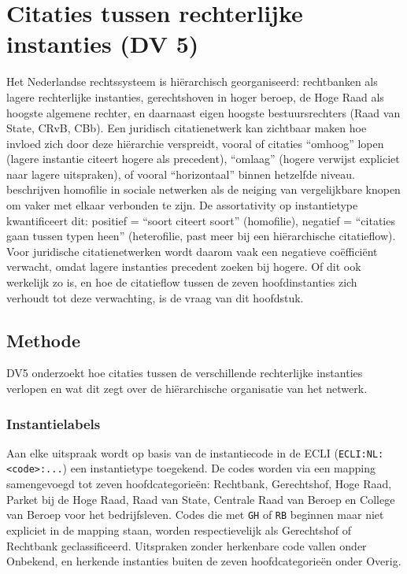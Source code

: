 \documentclass[a4paper, 12pt]{report}
\begin{document}
\chapter{Citaties tussen rechterlijke instanties (DV 5)}
\label{ch:dv5}

Het Nederlandse rechtssysteem is hiërarchisch georganiseerd: rechtbanken als lagere rechterlijke instanties, gerechtshoven in hoger beroep, de Hoge Raad als hoogste algemene rechter, en daarnaast eigen hoogste bestuursrechters (Raad van State, CRvB, CBb). Een juridisch citatienetwerk kan zichtbaar maken hoe invloed zich door deze hiërarchie verspreidt, vooral of citaties ``omhoog'' lopen (lagere instantie citeert hogere als precedent), ``omlaag'' (hogere verwijst expliciet naar lagere uitspraken), of vooral ``horizontaal'' binnen hetzelfde niveau. \textcite{mcpherson2001} beschrijven homofilie in sociale netwerken als de neiging van vergelijkbare knopen om vaker met elkaar verbonden te zijn. De assortativity op instantietype \parencite{newman2003} kwantificeert dit: positief = ``soort citeert soort'' (homofilie), negatief = ``citaties gaan tussen typen heen'' (heterofilie, past meer bij een hiërarchische citatieflow). Voor juridische citatienetwerken wordt daarom vaak een negatieve coëfficiënt verwacht, omdat lagere instanties precedent zoeken bij hogere. Of dit ook werkelijk zo is, en hoe de citatieflow tussen de zeven hoofdinstanties zich verhoudt tot deze verwachting, is de vraag van dit hoofdstuk.

\section{Methode}

DV5 onderzoekt hoe citaties tussen de verschillende rechterlijke instanties verlopen en wat dit zegt over de hiërarchische organisatie van het netwerk. 

\subsection{Instantielabels} Aan elke uitspraak wordt op basis van de instantiecode in de ECLI (\texttt{ECLI:NL:<code>:...}) een instantietype toegekend. De codes worden via een mapping samengevoegd tot zeven hoofdcategorieën: Rechtbank, Gerechtshof, Hoge Raad, Parket bij de Hoge Raad, Raad van State, Centrale Raad van Beroep en College van Beroep voor het bedrijfsleven. Codes die met \texttt{GH} of \texttt{RB} beginnen maar niet expliciet in de mapping staan, worden respectievelijk als Gerechtshof of Rechtbank geclassificeerd. Uitspraken zonder herkenbare code vallen onder Onbekend, en herkende instanties buiten de zeven hoofdcategorieën onder Overig.
\end{document}
